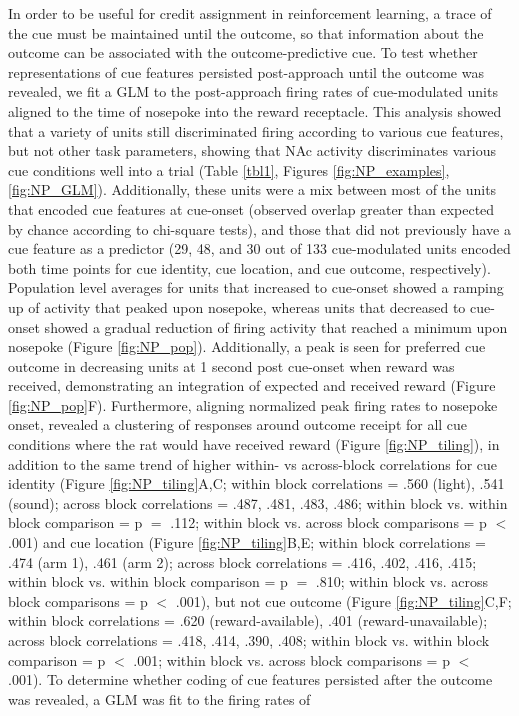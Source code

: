 \documentclass[11pt]{article}
\begin{document}
{In order to be useful for credit assignment in reinforcement learning, a trace
of the cue must be maintained until the outcome, so that information about the
outcome can be associated with the outcome-predictive cue. To test whether
representations of cue features persisted post-approach until the outcome
was revealed, we fit a GLM to the post-approach firing rates of cue-modulated
units aligned to the time of nosepoke into the reward receptacle. This analysis
showed that a variety of units still discriminated firing according to various
cue features, but not other task parameters, showing that NAc activity
discriminates various cue conditions well into a trial (Table \ref{tbl1},
Figures \ref{fig:NP_examples},\ref{fig:NP_GLM}). Additionally, these units were
a mix between most of the units that encoded cue features at cue-onset (observed
overlap greater than expected by chance according to chi-square tests), and those
that did not previously have a cue feature as a predictor (29, 48, and 30 out of 133 cue-modulated units encoded both time points for cue identity, cue location, and cue outcome,
respectively). Population level averages for units that increased to
cue-onset showed a ramping up of activity that peaked upon nosepoke, whereas
units that decreased to cue-onset showed a gradual reduction of firing activity
that reached a minimum upon nosepoke (Figure \ref{fig:NP_pop}). Additionally, a
peak is seen for preferred cue outcome in decreasing units at 1 second post
cue-onset when reward was received, demonstrating an integration of expected and
received reward (Figure \ref{fig:NP_pop}F). Furthermore, aligning normalized
peak firing rates to nosepoke onset, revealed a clustering of responses around
outcome receipt for all cue conditions where the rat would have received reward
(Figure \ref{fig:NP_tiling}), in addition to the same trend of higher within- vs across-block correlations for cue identity (Figure \ref{fig:NP_tiling}A,C; within block correlations = .560 (light), .541 (sound); across block correlations = .487, .481, .483, .486; within block vs. within block comparison = p $=$ .112; within block vs. across block comparisons = p $<$ .001) and cue location (Figure \ref{fig:NP_tiling}B,E; within block correlations = .474 (arm 1), .461 (arm 2); across block correlations = .416, .402, .416, .415; within block vs. within block comparison = p $=$ .810; within block vs. across block comparisons = p $<$ .001), but not cue outcome (Figure \ref{fig:NP_tiling}C,F; within block correlations = .620 (reward-available), .401 (reward-unavailable); across block correlations = .418, .414, .390, .408; within block vs. within block comparison = p $<$ .001; within block vs. across block comparisons = p $<$ .001). To determine whether coding of cue features persisted after the outcome was revealed, a GLM was fit to the firing rates of
}
\end{document}
